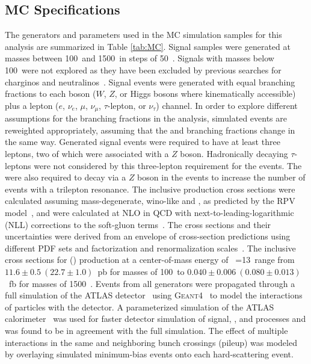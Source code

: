 \subsection{MC Specifications}
The generators and parameters used in the MC simulation samples for this analysis are summarized in Table \ref{tab:MC}.
Signal samples were generated at masses between 100~\GeV and 1500~\GeV in steps of 50~\GeV.
Signals with masses below 100~\GeV were not explored as they have been excluded by previous searches for charginos and neutralinos~\cite{SUSY-2016-24,SUSY-2013-12,CMS-SUS-16-039,CMS-SUS-17-004,EXOT-2014-07,EXOT-2014-08,CMS-EXO-17-006}.
Signal events were generated with equal \chono branching fractions to each boson ($W$, $Z$, or 
Higgs bosons where kinematically accessible) plus a lepton ($e$, $\nu_{e}$, $\mu$, $\nu_{\mu}$, $\tau$-lepton, or $\nu_{\tau}$) channel.
In order to explore different assumptions for the \chono branching fractions in the analysis, simulated events are reweighted appropriately, assuming that the \chone and \none branching fractions change in the same way.
Generated signal events were required to have at least three leptons, two of which were associated with a $Z$ boson.
Hadronically decaying $\tau$-leptons were not considered by this three-lepton requirement for the \CNsignal events.
The \chone were also required to decay via a $Z$ boson in the \CNsignal events to increase the number of events with a trilepton resonance.
The inclusive production cross sections were calculated assuming mass-degenerate, wino-like \chone and \none, as predicted by the \BL RPV model~\cite{Dumitru:2018jyb}, and were calculated at NLO in QCD with next-to-leading-logarithmic (NLL) corrections to the soft-gluon terms~\cite{Beenakker:1999xh,Debove:2010kf,Fuks:2012qx,Fuks:2013vua,Fiaschi:2018hgm}.
The cross sections and their uncertainties were derived from an envelope of cross-section predictions using different PDF sets and factorization and renormalization scales~\cite{Borschensky:2014cia}.
The inclusive cross sections for \CCsignal (\CNsignal) production at a center-of-mass energy of \rts\ =13~\TeV range from $11.6\pm0.5~(22.7\pm1.0)$~pb for masses of 100~\GeV to $0.040\pm0.006~(0.080\pm0.013)$~fb for masses of 1500~\GeV.
Events from all generators were propagated through a full simulation of the ATLAS detector~\cite{SOFT-2010-01} using \textsc{Geant4}~\cite{Agostinelli:2002hh}
to model the interactions of particles with the detector.
A parameterized simulation of the ATLAS calorimeter~\cite{SOFT-2010-01} was used for faster detector simulation of signal, \tW, and \ttH processes and was found to be in agreement with the full simulation.
The effect of multiple interactions in the same and neighboring bunch crossings (pileup) was modeled by overlaying simulated minimum-bias events onto each hard-scattering event.


